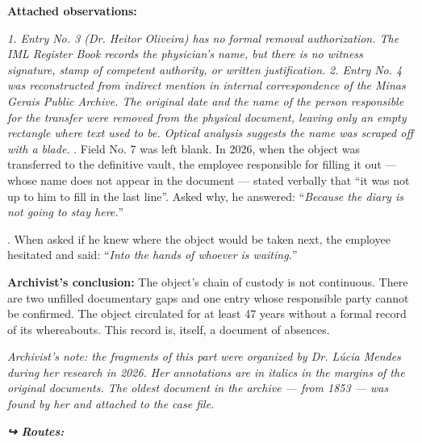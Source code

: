 \noindent \textbf{Attached observations:}

\noindent \textit{1. Entry No. 3 (Dr. Heitor Oliveira) has no formal removal authorization. The IML Register Book records the physician's name, but there is no witness signature, stamp of competent authority, or written justification.}
\noindent \textit{2. Entry No. 4 was reconstructed from indirect mention in internal correspondence of the Minas Gerais Public Archive. The original date and the name of the person responsible for the transfer were removed from the physical document, leaving only an empty rectangle where text used to be. Optical analysis suggests the name was scraped off with a blade.}
. Field No. 7 was left blank. In 2026, when the object was transferred to the definitive vault, the employee responsible for filling it out --- whose name does not appear in the document --- stated verbally that ``it was not up to him to fill in the last line''. Asked why, he answered: \textquotedblleft{}\textit{Because the diary is not going to stay here.}\textquotedblright{}

. When asked if he knew where the object would be taken next, the employee hesitated and said: \textquotedblleft{}\textit{Into the hands of whoever is waiting.}\textquotedblright{}

\noindent \textbf{Archivist's conclusion:}
\noindent The object's chain of custody is not continuous. There are two unfilled documentary gaps and one entry whose responsible party cannot be confirmed. The object circulated for at least 47 years without a formal record of its whereabouts.
\noindent This record is, itself, a document of absences.

\noindent \textit{Archivist's note: the fragments of this part were organized by Dr. Lúcia Mendes during her research in 2026. Her annotations are in italics in the margins of the original documents. The oldest document in the archive --- from 1853 --- was found by her and attached to the case file.}

\vspace{0.5em}
\noindent\textit{\textbf{↪ Routes:}  \rotasep {}}
